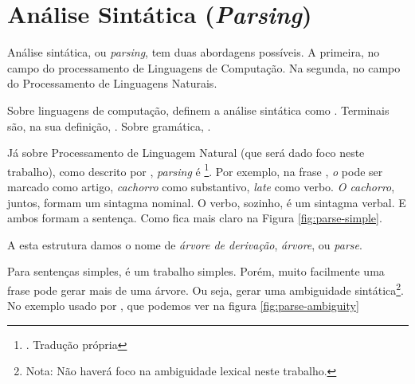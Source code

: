 \section{Análise Sintática (\textit{Parsing})}
\label{sec:parsing}

Análise sintática, ou \textit{parsing}, tem duas abordagens possíveis. A primeira, no campo do processamento de Linguagens de Computação. Na segunda, no campo do Processamento de Linguagens Naturais.

Sobre linguagens de computação,  definem a análise sintática como . Terminais são, na sua definição,  . Sobre gramática,  . 

Já sobre Processamento de Linguagem Natural (que será dado foco neste trabalho), como descrito por , \textit{parsing} é  \footnote{. Tradução própria}. Por exemplo, na frase , \textit{o} pode ser marcado como artigo, \textit{cachorro} como substantivo, \textit{late} como verbo. \textit{O cachorro}, juntos, formam um sintagma nominal. O verbo, sozinho, é um sintagma verbal. E ambos formam a sentença. Como fica mais claro na Figura \ref{fig:parse-simple}.

\begin{center}

\end{center}

A esta estrutura damos o nome de \textit{árvore de derivação}, \textit{árvore}, ou \textit{parse}.

Para sentenças simples, é um trabalho simples. Porém, muito facilmente uma frase pode gerar mais de uma árvore. Ou seja, gerar uma ambiguidade sintática\footnote{Nota: Não haverá foco na ambiguidade lexical neste trabalho.}. No exemplo usado por , que podemos ver na figura \ref{fig:parse-ambiguity}

\begin{center}

\end{center}

